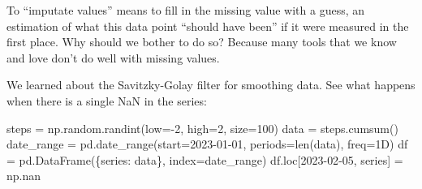 \documentclass[
  letterpaper,
  DIV=11,
  numbers=noendperiod,
  oneside]{scrreprt}
\newenvironment{Shaded}{\begin{snugshade}}{\end{snugshade}}
\newcommand{\BuiltInTok}[1]{\textcolor[rgb]{0.00,0.23,0.31}{#1}}
\newcommand{\DecValTok}[1]{\textcolor[rgb]{0.68,0.00,0.00}{#1}}
\newcommand{\NormalTok}[1]{\textcolor[rgb]{0.00,0.23,0.31}{#1}}
\newcommand{\OperatorTok}[1]{\textcolor[rgb]{0.37,0.37,0.37}{#1}}
\newcommand{\StringTok}[1]{\textcolor[rgb]{0.13,0.47,0.30}{#1}}
\begin{document}
To ``imputate values'' means to fill in the missing value with a guess,
an estimation of what this data point ``should have been'' if it were
measured in the first place. Why should we bother to do so? Because many
tools that we know and love don't do well with missing values.

We learned about the Savitzky-Golay filter for smoothing data. See what
happens when there is a single NaN in the series:

\begin{Shaded}
\begin{Highlighting}[]
\NormalTok{steps }\OperatorTok{=}\NormalTok{ np.random.randint(low}\OperatorTok{={-}}\DecValTok{2}\NormalTok{, high}\OperatorTok{=}\DecValTok{2}\NormalTok{, size}\OperatorTok{=}\DecValTok{100}\NormalTok{)}
\NormalTok{data }\OperatorTok{=}\NormalTok{ steps.cumsum()}
\NormalTok{date\_range }\OperatorTok{=}\NormalTok{ pd.date\_range(start}\OperatorTok{=}\StringTok{\textquotesingle{}2023{-}01{-}01\textquotesingle{}}\NormalTok{, periods}\OperatorTok{=}\BuiltInTok{len}\NormalTok{(data), freq}\OperatorTok{=}\StringTok{\textquotesingle{}1D\textquotesingle{}}\NormalTok{)}
\NormalTok{df }\OperatorTok{=}\NormalTok{ pd.DataFrame(\{}\StringTok{\textquotesingle{}series\textquotesingle{}}\NormalTok{: data\}, index}\OperatorTok{=}\NormalTok{date\_range)}
\NormalTok{df.loc[}\StringTok{\textquotesingle{}2023{-}02{-}05\textquotesingle{}}\NormalTok{, }\StringTok{\textquotesingle{}series\textquotesingle{}}\NormalTok{] }\OperatorTok{=}\NormalTok{ np.nan}
\end{Highlighting}
\end{Shaded}
\end{document}
